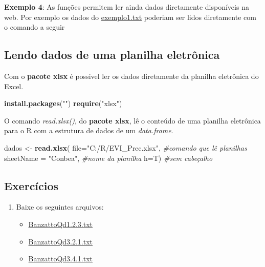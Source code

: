 \documentclass[
]{book}
\newenvironment{Shaded}{\begin{snugshade}}{\end{snugshade}}
\newcommand{\CommentTok}[1]{\textcolor[rgb]{0.56,0.35,0.01}{\textit{#1}}}
\newcommand{\DataTypeTok}[1]{\textcolor[rgb]{0.13,0.29,0.53}{#1}}
\newcommand{\KeywordTok}[1]{\textcolor[rgb]{0.13,0.29,0.53}{\textbf{#1}}}
\newcommand{\NormalTok}[1]{#1}
\newcommand{\StringTok}[1]{\textcolor[rgb]{0.31,0.60,0.02}{#1}}
\providecommand{\tightlist}{%
  \setlength{\itemsep}{0pt}\setlength{\parskip}{0pt}}
\begin{document}
\textbf{Exemplo 4}: As funções permitem ler ainda dados diretamente disponíveis na web. Por exemplo os dados do \href{https://www.dropbox.com/s/m7jivbbggei5y0x/exemplo1.txt?dl=1}{exemplo1.txt} poderiam ser lidos diretamente com o comando a seguir

\hypertarget{lendo-dados-de-uma-planilha-eletruxf4nica}{%
\subsection{Lendo dados de uma planilha eletrônica}\label{lendo-dados-de-uma-planilha-eletruxf4nica}}

Com o \textbf{pacote xlsx} é possivel ler os dados diretamente da planilha eletrônica do Excel.

\begin{Shaded}
\begin{Highlighting}[]
\KeywordTok{install.packages}\NormalTok{(}\StringTok{""}\NormalTok{)}
\KeywordTok{require}\NormalTok{(}\StringTok{"xlsx"}\NormalTok{)}
\end{Highlighting}
\end{Shaded}

O comando \emph{read.xlsx()}, do \textbf{pacote xlsx}, lê o conteúdo de uma planilha eletrônica para o R com a estrutura de dados de um \emph{data.frame}.

\begin{Shaded}
\begin{Highlighting}[]
\NormalTok{dados <-}\StringTok{ }\KeywordTok{read.xlsx}\NormalTok{(}
                    \DataTypeTok{file=}\StringTok{"C:/R/EVI_Prec.xlsx"}\NormalTok{,     }\CommentTok{#comando que lê planilhas}
                    \DataTypeTok{sheetName =} \StringTok{"Conbea"}\NormalTok{,          }\CommentTok{#nome da planilha}
                    \DataTypeTok{h=}\NormalTok{T)                           }\CommentTok{#sem cabeçalho  }
\end{Highlighting}
\end{Shaded}

\hypertarget{exercuxedcios}{%
\subsection{Exercícios}\label{exercuxedcios}}

\begin{enumerate}
\def\labelenumi{\arabic{enumi}.}
\tightlist
\item
  Baixe os seguintes arquivos:

  \begin{itemize}
  \tightlist
  \item
    \href{https://www.dropbox.com/s/uq1n2sv8an2eoan/BanzattoQd1.2.3.txt?dl=1}{BanzattoQd1.2.3.txt}
  \item
    \href{https://www.dropbox.com/s/jjyo8dhyy0qt3ft/BanzattoQd3.2.1.txt?dl=1}{BanzattoQd3.2.1.txt}
  \item
    \href{https://www.dropbox.com/s/yv5clm6qljurzbw/BanzattoQd3.4.1.txt?dl=1}{BanzattoQd3.4.1.txt}
  \end{itemize}
\end{enumerate}
\end{document}
